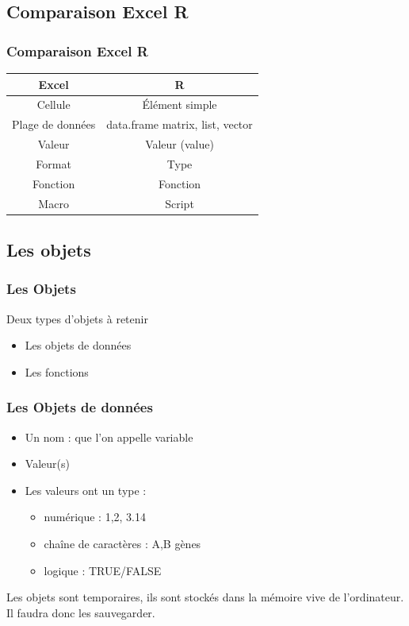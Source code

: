 \documentclass[table,svgnames,hyperref={pdfpagemode=FullScreen}]{beamer}
\begin{document}
\subsection{Comparaison Excel R}
\begin{frame}
	\frametitle{Comparaison Excel R}
	\begin{center}
{
	\begin{tabular}[h]{cc}
		\hline
		\textbf{Excel} &  \textbf{R} \pause\\
		\hline 
		
		Cellule & Élément simple \\
		Plage de données & data.frame matrix, list, vector \pause\\
		\hline
		Valeur & Valeur (value) \\
		Format & Type \pause\\
		\hline
		Fonction & Fonction \\
		Macro & Script \\
		\hline
	\end{tabular}}
	\end{center}
\end{frame}
\subsection{Les objets}
\begin{frame}
	\frametitle{Les Objets}
	\begin{exampleblock}{Deux types d'objets à retenir}
	\begin{itemize}
		\item Les objets de données
		\item Les fonctions
	\end{itemize}
	\end{exampleblock}
\end{frame}
\begin{frame}
	\frametitle{Les Objets de données}
	\begin{itemize}
		\item Un nom : que l'on appelle  variable
		\item Valeur(s)
		\item Les valeurs ont un type : 
			\begin{itemize}
				\item numérique : 1,2, 3.14
				\item chaîne de caractères : A,B gènes
				\item logique : TRUE/FALSE
			\end{itemize}
	\end{itemize}
	Les objets sont temporaires, ils sont stockés dans la mémoire vive de l'ordinateur. Il faudra donc les sauvegarder.
\end{frame}
\end{document}
